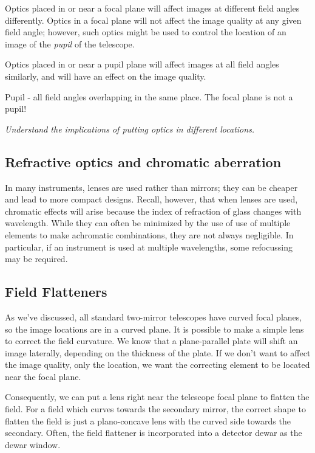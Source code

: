 \documentclass[12pt]{article}
\newcommand{\mynotes}[1]{\textcolor{myBlue}{#1}}
\newcommand{\test}[1]{%
    \begin{center}
        {\parbox{0.9\textwidth}{\textit{\small#1}}}
    \end{center}}
\begin{document}
Optics placed in or near a focal plane will affect images at different field
angles differently. Optics in a focal plane will not affect the image quality
at any given field angle; however, such optics might be used to control the
location of an image of the \textit{pupil} of the telescope.

Optics placed in or near a pupil plane will affect images at all field
angles similarly, and will have an effect on the image quality.

\mynotes{Pupil - all field angles overlapping in the same place. The focal
plane is not a pupil!}

\test{Understand the implications of putting optics in different locations.}

\subsection{Refractive optics and chromatic aberration}
In many instruments, lenses are used rather than mirrors; they can be cheaper
and lead to more compact designs. Recall, however, that when lenses are used,
chromatic effects will arise because the index of refraction of glass changes
with wavelength. While they can often be minimized by the use of use of
multiple elements to make achromatic combinations, they are not always
negligible. In particular, if an instrument is used at multiple wavelengths,
some refocussing may be required.

\subsection{Field Flatteners}
As we've discussed, all standard two-mirror telescopes have curved focal
planes, so the image locations are in a curved plane. It is possible to make a
simple lens to correct the field curvature. We know that a plane-parallel plate
will shift an image laterally, depending on the thickness of the plate. If we
don't want to affect the image quality, only the location, we want the
correcting element to be located near the focal plane.

Consequently, we can put a lens right near the telescope focal plane to
flatten the field. For a field which curves towards the secondary
mirror, the correct shape to flatten the field is just
a plano-concave lens with the curved side towards the secondary.
Often, the field flattener is incorporated into a detector dewar as
the dewar window.
\end{document}
